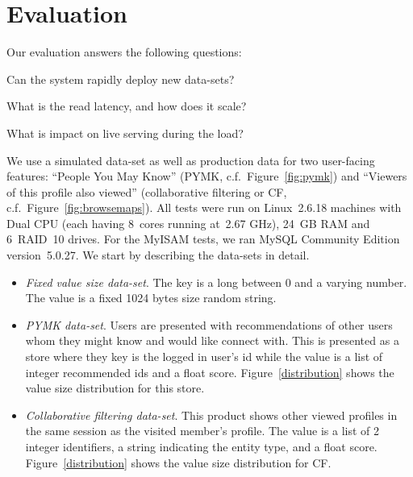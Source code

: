 \section{Evaluation}
\label{sec:evaluation}

Our evaluation answers the following questions:
\begin{compactenum}
\item Can the system rapidly deploy new data-sets?
\item What is the read latency, and how does it scale?
\item What is impact on live serving during the load?
\end{compactenum}

We use a simulated data-set as well as production data for two
user-facing features: ``People You May Know'' (PYMK,
c.f.~Figure~\ref{fig:pymk}) and ``Viewers of this profile also
viewed'' (collaborative filtering or CF,
c.f.~Figure~\ref{fig:browsemaps}). All tests were run on Linux~2.6.18
machines with Dual CPU (each having 8~cores running at~2.67 GHz),
24~GB RAM and 6~RAID~10 drives. For the MyISAM tests, we ran MySQL
Community Edition version~5.0.27. We start by describing the data-sets
in detail.

\begin{itemize}
\item \emph{Fixed value size data-set}. The key is a long between
0 and a varying number. The value is a fixed 1024 bytes size random
string. 
\item \emph{PYMK data-set}. Users are presented with recommendations
of other users whom they might know and would like connect with. This
is presented as a store where they key is the logged in user's id
while the value is a list of integer recommended ids and a float
score. Figure~\ref{distribution} shows the value size distribution for
this store. 
\item \emph{Collaborative filtering data-set}. This product shows
other viewed profiles in the same session as the visited member's
profile. The value is a list of 2 integer identifiers, a string
indicating the entity type, and a float score.
Figure~\ref{distribution} shows the value size distribution for CF. 
\end{itemize}

